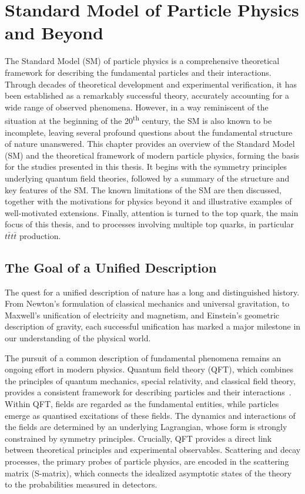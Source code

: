 ﻿%

\chapter{Standard Model of Particle Physics and Beyond}
\label{chap:theory}

The Standard Model (SM) of particle physics is a comprehensive theoretical framework for describing the fundamental particles and their interactions.
Through decades of theoretical development and experimental verification, it has been established as a remarkably successful theory, accurately accounting for a wide range of observed phenomena.
However, in a way reminiscent of the situation at the beginning of the 20\textsuperscript{th} century, the SM is also known to be incomplete, leaving several profound questions about the fundamental structure of nature unanswered.
This chapter provides an overview of the Standard Model (SM) and the theoretical framework of modern particle physics, forming the basis for the studies presented in this thesis. 
It begins with the symmetry principles underlying quantum field theories, followed by a summary of the structure and key features of the SM. 
The known limitations of the SM are then discussed, together with the motivations for physics beyond it and illustrative examples of well-motivated extensions.
Finally, attention is turned to the top quark, the main focus of this thesis, and to processes involving multiple top quarks, in particular $t\bar{t}t\bar{t}$ production.

\section{The Goal of a Unified Description}
\label{sec:unified}

The quest for a unified description of nature has a long and distinguished history.
From Newton's formulation of classical mechanics and universal gravitation,
to Maxwell's unification of electricity and magnetism, and Einstein's geometric description of gravity,
each successful unification has marked a major milestone in our understanding of the physical world.

The pursuit of a common description of fundamental phenomena remains an ongoing effort in modern physics.
Quantum field theory (QFT), which combines the principles of quantum mechanics, special relativity, and classical field theory,
provides a consistent framework for describing particles and their interactions~\cite{PeskinSchroeder,WeinbergQFT,Schwartz2014QFTSM}.
Within QFT, fields are regarded as the fundamental entities, while particles emerge as quantised excitations of these fields.
The dynamics and interactions of the fields are determined by an underlying Lagrangian, whose form is strongly constrained by symmetry principles.
Crucially, QFT provides a direct link between theoretical principles and experimental observables. 
Scattering and decay processes, the primary probes of particle physics, are encoded in the scattering matrix (S-matrix), which connects the idealized asymptotic states of the theory to the probabilities measured in detectors.

